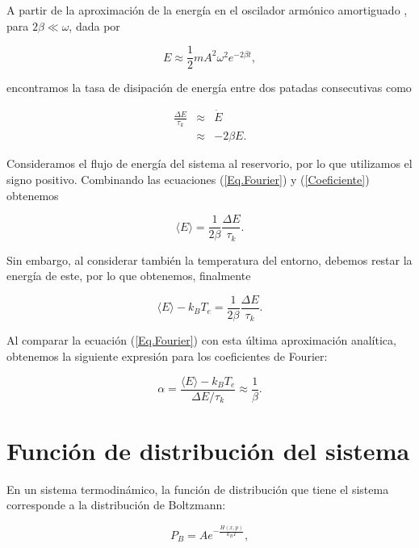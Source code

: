 \documentclass[letterpaper,12pt,oneside]{book}
\begin{document}
	A partir de la aproximación de la energía en el oscilador armónico amortiguado \cite{Energy}, para $2\beta \ll \omega$, dada por 
	
	\begin{equation}
	E \approx \frac{1}{2}mA^2\omega^2e^{-2\beta t},
	\end{equation}
	
	
	\noindent encontramos la tasa de disipación de energía entre dos patadas consecutivas como
	
	\begin{eqnarray} \label{Coeficiente}
	\frac{\Delta E}{\tau_k} & \approx & \dot{E}\nonumber\\ 
	&\approx& -2\beta E.
	\end{eqnarray}
	
	Consideramos el flujo de energía del sistema al reservorio, por lo que utilizamos el signo positivo. Combinando las ecuaciones (\ref{Eq.Fourier}) y (\ref{Coeficiente}) obtenemos
	
	\begin{equation}
	\langle E  \rangle = \frac{1}{2\beta} \frac{\Delta E}{\tau_k}.
	\end{equation}
	
	Sin embargo, al considerar también la temperatura del entorno, debemos restar la energía de este, por lo que obtenemos, finalmente
	
	\begin{equation}
	\langle E  \rangle - k_BT_e = \frac{1}{2\beta} \frac{\Delta E}{\tau_k}.
	\end{equation}
	
	Al comparar la ecuación (\ref{Eq.Fourier}) con esta última aproximación analítica, obtenemos la siguiente expresión para los coeficientes de Fourier:
	
	\begin{equation}\label{eq:FourierNumericalCoeffs}
	\alpha = \frac{\langle E \rangle - k_B T_e}{\Delta E/\tau_k} \approx \frac{1}{\beta}.
	\end{equation}
	
	\section{Funci\'on de distribuci\'on del sistema}
	
	En un sistema termodinámico, la función de distribución que tiene el sistema corresponde a la distribución de Boltzmann:
	
	
	\begin{equation}\label{Eq:BoltzmannDist}
	P_B = Ae^{-\frac{H(x,p)}{k_BT}},
	\end{equation}
	
\end{document}
